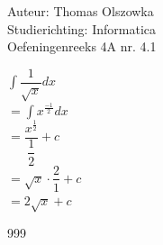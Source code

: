 \documentclass[a4paper]{article}
\newcommand{\dint}{\displaystyle\int}
\begin{document}
\noindent \large Auteur: Thomas Olszowka \\
\noindent \large Studierichting: Informatica \\
\noindent \large Oefeningenreeks 4A nr. 4.1  \\



\medskip

\normalsize

$\dint \dfrac{1}{\sqrt{x}} dx$ \\

$= \dint x^{\tfrac{-1}{2}} dx$ \\

$= \dfrac{x^{\tfrac{1}{2}}}{\dfrac{1}{2}} + c$ \\

$= \sqrt{x} \cdot \dfrac{2}{1} + c$ \\

$= 2\sqrt{x} + c$ \\

\begin{thebibliography}{999}
\end{thebibliography}
\end{document}
